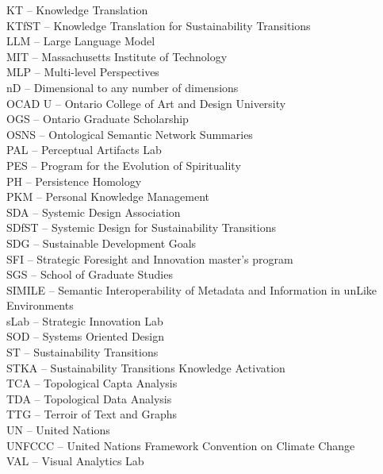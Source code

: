 \noindent KT – Knowledge Translation \\
\noindent KTfST – Knowledge Translation for Sustainability Transitions \\
\noindent LLM – Large Language Model \\
\noindent MIT – Massachusetts Institute of Technology \\
\noindent MLP – Multi-level Perspectives \\
\noindent nD – Dimensional to any number of dimensions \\
\noindent OCAD U – Ontario College of Art and Design University \\
\noindent OGS – Ontario Graduate Scholarship \\
\noindent OSNS – Ontological Semantic Network Summaries \\
\noindent PAL – Perceptual Artifacts Lab \\
\noindent PES – Program for the Evolution of Spirituality \\
\noindent PH – Persistence Homology \\
\noindent PKM – Personal Knowledge Management \\
\noindent SDA – Systemic Design Association \\
\noindent SDfST – Systemic Design for Sustainability Transitions \\
\noindent SDG – Sustainable Development Goals \\
\noindent SFI – Strategic Foresight and Innovation master's program \\
\noindent SGS – School of Graduate Studies \\
\noindent SIMILE – Semantic Interoperability of Metadata and Information in unLike Environments \\
\noindent sLab – Strategic Innovation Lab \\
\noindent SOD – Systems Oriented Design \\
\noindent ST – Sustainability Transitions \\
\noindent STKA – Sustainability Transitions Knowledge Activation \\
\noindent TCA – Topological Capta Analysis \\
\noindent TDA – Topological Data Analysis \\
\noindent TTG – Terroir of Text and Graphs \\
\noindent UN – United Nations \\
\noindent UNFCCC – United Nations Framework Convention on Climate Change \\
\noindent VAL – Visual Analytics Lab \\